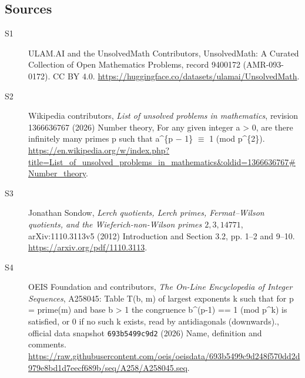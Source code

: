\documentclass[11pt]{article}
\begin{document}
\subsection{Sources}
\begin{description}
\item[\hypertarget{source:9400172:1}{S1}] ULAM.AI and the UnsolvedMath Contributors, UnsolvedMath: A Curated Collection of Open Mathematics Problems, record 9400172 (AMR-093-0172). CC BY 4.0. \url{https://huggingface.co/datasets/ulamai/UnsolvedMath}.
\item[\hypertarget{source:9400172:2}{S2}] Wikipedia contributors, \emph{List of unsolved problems in mathematics}, revision 1366636767 (2026) Number theory, For any given integer a > 0, are there infinitely many primes p such that a\textasciicircum{}\{p − 1\} $\equiv$ 1 (mod p\textasciicircum{}\{2\}). \url{https://en.wikipedia.org/w/index.php?title=List_of_unsolved_problems_in_mathematics&oldid=1366636767#Number_theory}.
\item[\hypertarget{source:9400172:3}{S3}] Jonathan Sondow, \emph{Lerch quotients, Lerch primes, Fermat--Wilson quotients, and the Wieferich-non-Wilson primes $2,3,14771$}, arXiv:1110.3113v5 (2012) Introduction and Section 3.2, pp. 1--2 and 9--10. \url{https://arxiv.org/pdf/1110.3113}.
\item[\hypertarget{source:9400172:4}{S4}] OEIS Foundation and contributors, \emph{The On-Line Encyclopedia of Integer Sequences}, A258045: Table T(b, m) of largest exponents k such that for p = prime(m) and base b > 1 the congruence b\textasciicircum{}(p-1) == 1 (mod p\textasciicircum{}k) is satisfied, or 0 if no such k exists, read by antidiagonals (downwards)., official data snapshot \texttt{693b5499c9d2} (2026) Name, definition and comments. \url{https://raw.githubusercontent.com/oeis/oeisdata/693b5499c9d248f570dd2d979e8bd1d7eecf689b/seq/A258/A258045.seq}.
\end{description}
\label{end:9400172}
\end{document}
